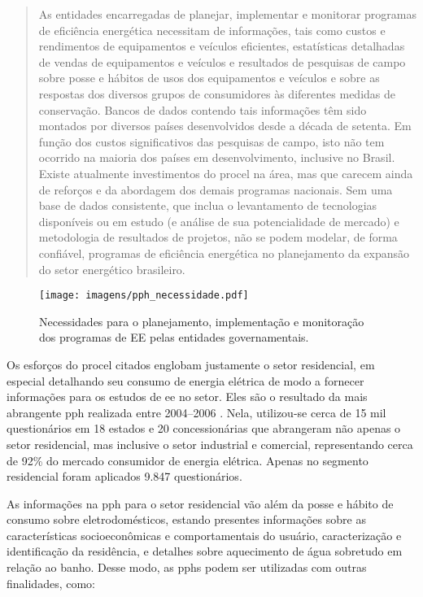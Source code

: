 \begin{quote}
As entidades encarregadas de planejar, implementar e monitorar
programas de eficiência energética necessitam de informações, tais
como custos e rendimentos de equipamentos e veículos eficientes,
estatísticas detalhadas de vendas de equipamentos e veículos e
resultados de pesquisas de campo sobre posse e hábitos de usos dos
equipamentos e veículos e sobre as respostas dos diversos grupos de
consumidores às diferentes medidas de conservação. Bancos de dados
contendo tais informações têm sido montados por diversos países
desenvolvidos desde a década de setenta. Em função dos custos
significativos das pesquisas de campo, isto não tem ocorrido na
maioria dos países em desenvolvimento, inclusive no Brasil. Existe
atualmente investimentos do \gls{procel} na área, mas que carecem
ainda de reforços e da abordagem dos demais programas nacionais. Sem
uma base de dados consistente, que inclua o levantamento de
tecnologias disponíveis ou em estudo (e análise de sua potencialidade
de mercado) e metodologia de resultados de projetos, não se podem
modelar, de forma confiável, programas de eficiência energética no
planejamento da expansão do setor energético brasileiro.
\end{quote}

\begin{figure}[h!t]
\centering
\texttt{[image: imagens/pph\_necessidade.pdf]}
\caption{Necessidades para o planejamento, implementação e monitoração
dos programas de EE pelas entidades governamentais.}
\label{fig:pph_necessidades}

\end{figure}
Os esforços do \gls{procel} citados englobam justamente o setor
residencial, em especial detalhando seu consumo de energia elétrica de
modo a fornecer informações para os estudos de \gls{ee} no setor. Eles
são o resultado da mais abrangente \gls{pph} realizada entre
2004--2006 \cite{result_procel_2005,site_pesquisas_procel}.  Nela,
utilizou-se cerca de 15 mil questionários em 18 estados e 20
concessionárias que abrangeram não apenas o setor residencial, mas
inclusive o setor industrial e comercial, representando cerca de 92\%
do mercado consumidor de energia elétrica.  Apenas no segmento
residencial foram aplicados 9.847 questionários.  

As informações na \gls{pph} para o setor residencial vão além da posse
e hábito de consumo sobre eletrodomésticos, estando presentes
informações sobre as características socioeconômicas e comportamentais
do usuário, caracterização e identificação da residência, e detalhes
sobre aquecimento de água sobretudo em relação ao banho. Desse modo,
as \glspl{pph} podem ser utilizadas com outras finalidades, como:


